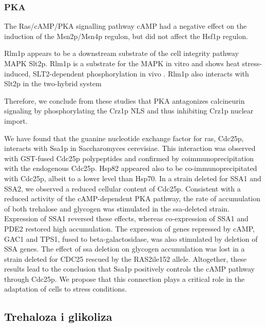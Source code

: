 \documentclass{pracamgr}
\begin{document}
\subsubsection{PKA}
The Ras/cAMP/PKA signalling
pathway cAMP had a negative effect on the induction
of the Msn2p/Msn4p regulon, but did not affect the
Hsf1p regulon.\cite{MsnContraHsf1}

Rlm1p appears to be a downstream substrate of the cell integrity pathway MAPK Slt2p.
Rlm1p is a substrate for the MAPK in vitro and shows heat stress-induced, SLT2-dependent phosphorylation
in vivo . Rlm1p also interacts with Slt2p in the two-hybrid system\cite{MAPKinasePathways}

Therefore, we conclude from these studies that PKA antagonizes calcineurin signaling by phosphorylating the Crz1p NLS and thus inhibiting Crz1p nuclear import.\cite{PKAandCalcineurin}

We have found that the guanine nucleotide exchange factor for ras, Cdc25p, interacts with Ssa1p in Saccharomyces cerevisiae.
This interaction was observed with GST-fused Cdc25p polypeptides and confirmed by coimmunoprecipitation with the endogenous Cdc25p.
Hsp82 appeared also to be co-immunoprecipitated with Cdc25p, albeit to a lower level than Hsp70. In a strain deleted for SSA1 and SSA2,
we observed a reduced cellular content of Cdc25p. Consistent with a reduced activity of the cAMP-dependent PKA pathway, the rate of accumulation
of both trehalose and glycogen was stimulated in the ssa-deleted strain. Expression of SSA1 reversed these effects, whereas co-expression of SSA1
and PDE2 restored high accumulation. The expression of genes repressed by cAMP, GAC1 and TPS1, fused to beta-galactosidase, was also stimulated by 
deletion of SSA genes. The effect of ssa deletion on glycogen accumulation was lost in a strain deleted for CDC25 rescued by the RAS2ile152 allele.
Altogether, these results lead to the conclusion that Ssa1p positively controls the cAMP pathway through Cdc25p. We propose that this connection plays
a critical role in the adaptation of cells to stress conditions.\cite{Ssa1ControlscAmp}
\subsection{Trehaloza i glikoliza}
\end{document}
